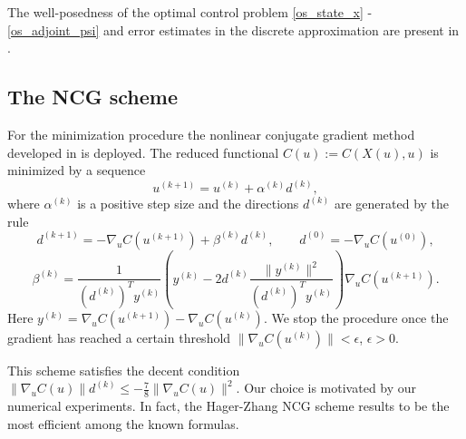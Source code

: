 \documentclass[a4paper, english]{article}
\begin{document}
 The well-posedness of the optimal control problem \eqref{os_state_x} - \eqref{os_adjoint_psi} and error estimates in the discrete approximation are present in \cite{Hager2000}.



 \subsection{The NCG scheme}
  For the minimization procedure the nonlinear conjugate gradient  method developed in \cite{hagerzhang} is deployed.
  The reduced functional $C(u):=C(X(u), u)$ is minimized by a sequence
  \begin{equation}
  u^{(k+1)} =   u^{(k)} + \alpha^{(k)} d^{(k)},
  \label{ncgscheme}
   \end{equation}
  where $\alpha^{(k)}$ is a positive step size and the directions $d^{(k)}$ are generated by the rule
  \begin{equation}
  d^{(k+1)} = - \nabla_u C(u^{(k+1)}) + \beta^{(k)} d^{(k)}, \qquad d^{(0)} = -\nabla_u C(u^{(0)}),
  \label{drct}
  \end{equation}
  \begin{equation}
  \beta^{(k)} = \frac{1}{(d^{(k)})^T y^{(k)}} \left( y^{(k)} - 2d^{(k)}\frac{\|y^{(k)}\|^2}{(d^{(k)})^T y^{(k)}}\right)\nabla_u C(u^{(k+1)}).
  \label{drct}
  \end{equation}
  Here $y^{(k)} = \nabla_u C(u^{(k+1)}) - \nabla_u C(u^{(k)})$.
  We stop the procedure once the gradient has reached a certain threshold $\|\nabla_u C(u^{(k)})\| < \epsilon$, $\epsilon > 0$.

  This scheme satisfies the decent condition $\|\nabla_u C(u)\|d^{(k)} \leq -\frac{7}{8}\|\nabla_u C(u)\|^2$. Our choice is motivated by our numerical experiments. In fact, the Hager-Zhang NCG scheme results to be the most efficient among the known formulas.
\end{document}

